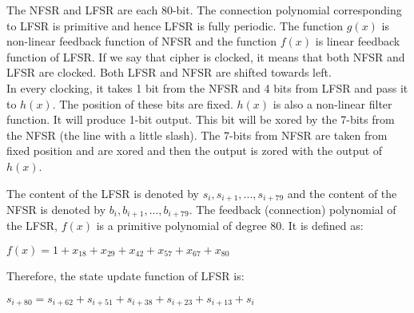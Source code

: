 \documentclass[11pt]{article}
\begin{document}
\begin{center}
\end{center}

The NFSR and LFSR are each 80-bit. The connection polynomial corresponding to LFSR is primitive and hence LFSR is fully periodic. The function $g(x)$ is non-linear feedback function  of NFSR and the function $f(x)$ is linear feedback function of LFSR. If we say that cipher is clocked, it means that both NFSR and LFSR are clocked. Both LFSR and NFSR are shifted towards left.\\
\newline
In every clocking, it takes 1 bit from the NFSR and 4 bits from LFSR and pass it to $h(x)$. The position of these bits are fixed. $h(x)$ is also a non-linear filter function. It will produce 1-bit output. This bit will be xored by the 7-bits from the NFSR (the line with a little slash). The 7-bits from NFSR are taken from fixed position and are xored and then the output is zored with the output of $h(x)$.\\
\newline



The content of the LFSR is denoted by $s_i, s_{i+1}, . . . , s_{i+79}$ and the content of the NFSR is denoted by $b_i, b_{i+1}, . . . , b_{i+79}$.
The feedback (connection) polynomial of the LFSR, $f(x)$ is a primitive polynomial of degree
80. It is defined as:
\begin{center}
    $f(x) = 1 + x_{18} + x_{29} + x_{42} + x_{57} + x_{67} + x_{80}$
\end{center}
Therefore, the state update function of LFSR is:
\begin{center}
    $s_{i+80} = s_{i+62} + s_{i+51} + s_{i+38} + s_{i+23} + s_{i+13} + s_i$
\end{center}
\end{document}
